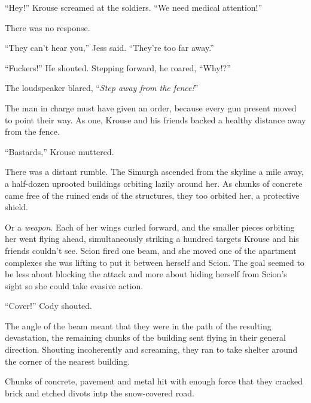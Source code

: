 





``Hey!''  Krouse screamed at the soldiers.  ``We need medical attention!''



There was no response.



``They can't hear you,'' Jess said.  ``They're too far away.''



``Fuckers!''  He shouted.  Stepping forward, he roared, ``Why!?''



The loudspeaker blared, ``\emph{Step away from the fence!}''



The man in charge must have given an order, because every gun present moved to point their way.  As one, Krouse and his friends backed a healthy distance away from the fence.



``Bastards,'' Krouse muttered.



There was a distant rumble.  The Simurgh ascended from the skyline a mile away, a half-dozen uprooted buildings orbiting lazily around her.  As chunks of concrete came free of the ruined ends of the structures, they too orbited her, a protective shield.



Or a \emph{weapon}.  Each of her wings curled forward, and the smaller pieces orbiting her went flying ahead, simultaneously striking a hundred targets Krouse and his friends couldn't see.  Scion fired one beam, and she moved one of the apartment complexes she was lifting to put it between herself and Scion.  The goal seemed to be less about blocking the attack and more about hiding herself from Scion's sight so she could take evasive action.



``Cover!'' Cody shouted.



The angle of the beam meant that they were in the path of the resulting devastation, the remaining chunks of the building sent flying in their general direction.  Shouting incoherently and screaming, they ran to take shelter around the corner of the nearest building.



Chunks of concrete, pavement and metal hit with enough force that they cracked brick and etched divots intp the snow-covered road.



